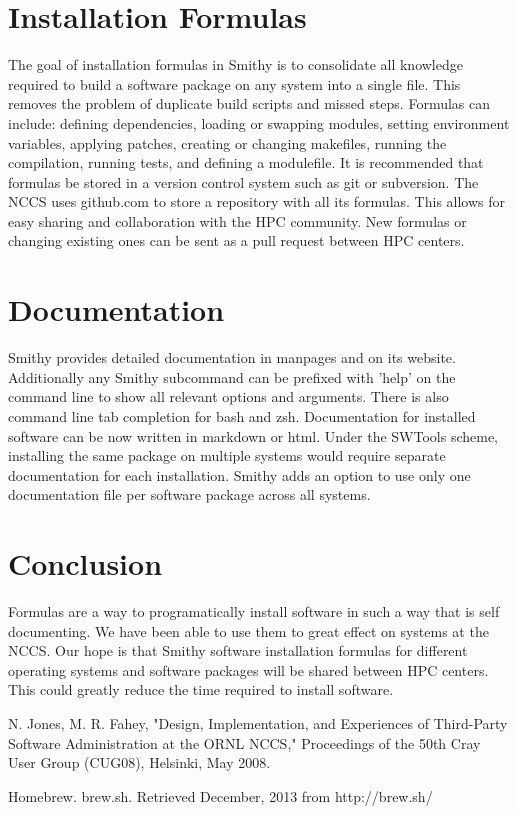 \documentclass[conference]{IEEEtran}
\begin{document}
\section{Installation Formulas}

The goal of installation formulas in Smithy is to consolidate all knowledge
required to build a software package on any system into a single file.  This
removes the problem of duplicate build scripts and missed steps.  Formulas can
include: defining dependencies, loading or swapping modules, setting environment
variables, applying patches, creating or changing makefiles, running the
compilation, running tests, and defining a modulefile.  It is recommended that
formulas be stored in a version control system such as git or subversion.  The
NCCS uses github.com to store a repository with all its formulas.  This allows
for easy sharing and collaboration with the HPC community.  New formulas or
changing existing ones can be sent as a pull request between HPC centers.

\section{Documentation}

Smithy provides detailed documentation in manpages and on its website.
Additionally any Smithy subcommand can be prefixed with 'help' on the command line
to show all relevant options and arguments.  There is also command line tab
completion for bash and zsh.  Documentation for installed software can be now
written in markdown or html.  Under the SWTools scheme, installing the same
package on multiple systems would require separate documentation for each
installation.  Smithy adds an option to use only one documentation file per
software package across all systems.

\section{Conclusion}

Formulas are a way to programatically install software in such a way that is
self documenting.  We have been able to use them to great effect on systems at
the NCCS.  Our hope is that Smithy software installation formulas for different
operating systems and software packages will be shared between HPC centers. This
could greatly reduce the time required to install software.


\begin{thebibliography}{1}

N. Jones, M. R. Fahey, "Design, Implementation, and Experiences of Third-Party
Software Administration at the ORNL NCCS," Proceedings of the 50th Cray User
Group (CUG08), Helsinki, May 2008.

Homebrew. brew.sh. Retrieved December, 2013 from http://brew.sh/

\end{thebibliography}
\end{document}
